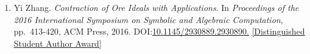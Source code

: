 \documentclass[a4paper,12pt]{article}
\begin{document}
\begin{enumerate}
\item Yi Zhang. {\em Contraction of Ore Ideals with Applications}. 
In {\em Proceedings of the 2016 International Symposium on Symbolic and Algebraic Computation}, 
pp.\ 413-420, ACM Press, 2016. DOI:\href{http://dl.acm.org/citation.cfm?id=2930890}{10.1145/2930889.2930890.} 
\href{https://www.sigsam.org/Awards/ISSACAwards.html}{[Distinguished Student Author Award]}
\end{enumerate}


%
%
\end{document}
